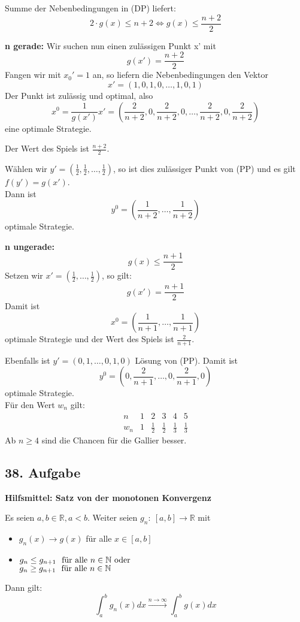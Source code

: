 \documentclass[a4paper,11pt,twoside,titlepage]{article}
\newcommand{\R}{{\mathbb R}}
\newcommand{\N}{{\mathbb N}}
\begin{document}
Summe der Nebenbedingungen in (DP) liefert:
\[2\cdot g(x)\leq n+2\Leftrightarrow g(x)\leq\frac{n+2}{2}\]

\textbf{n gerade:} Wir suchen nun einen zulässigen Punkt x' mit
\[g(x')=\frac{n+2}{2}\]
Fangen wir mit $x_0'=1$ an, so liefern die Nebenbedingungen den Vektor
\[x'=(1,0,1,0,\ldots,1,0,1)\]
Der Punkt ist zulässig und optimal, also
\[x^0=\frac{1}{g(x')}x'=(\frac{2}{n+2},0,\frac{2}{n+2},0,\ldots,\frac{2}{n+2},0,\frac{2}{n+2})\]
eine optimale Strategie.

Der Wert des Spiels ist $\frac{n+2}{2}$.

Wählen wir $y'=(\frac 12,\frac 12,\ldots,\frac 12)$, so ist dies zulässiger Punkt von (PP) und es gilt $f(y')=g(x')$.\\
Dann ist 
\[y^0=(\frac{1}{n+2},\ldots,\frac{1}{n+2})\]
optimale Strategie.

\textbf{n ungerade:} \[g(x)\leq\frac{n+1}{2}\]
Setzen wir $x'=(\frac 12,\ldots,\frac 12)$, so gilt:
\[g(x')=\frac{n+1}{2}\]
Damit ist
\[x^0=(\frac{1}{n+1},\ldots,\frac{1}{n+1})\]
optimale Strategie und der Wert des Spiels ist $\frac{2}{n+1}$.

Ebenfalls ist $y'=(0,1,\ldots,0,1,0)$ Lösung von (PP). Damit ist 
\[y^0=(0,\frac{2}{n+1},\ldots,0,\frac{2}{n+1},0)\]
optimale Strategie.\\[12pt]

Für den Wert $w_n$ gilt:
\[\begin{array}{c|ccccc}
n&1&2&3&4&5\\\hline
w_n&1&\frac 12&\frac 12&\frac13&\frac13\end{array}\]
Ab $n\geq4$ sind die Chancen für die Gallier besser.

\subsection*{38. Aufgabe}
\textbf{Hilfsmittel: Satz von der monotonen Konvergenz}

Es seien $a,b\in\R, a<b$. Weiter seien $g_n:\ [a,b]\to\R$ mit 
\begin{itemize}
\item $g_n(x)\to g(x)$ für alle $x\in[a,b]$
\item $g_n\leq g_{n+1}\ \textnormal{ für alle }n\in\N\ \textnormal{oder}$\\
$g_n\geq g_{n+1}\ \textnormal{ für alle }n\in\N$
\end{itemize}
Dann gilt:
\[\int_a^bg_n(x)dx\stackrel{n\to\infty}{\to}\int_a^bg(x)dx\]
~\\[12pt]
\end{document}
